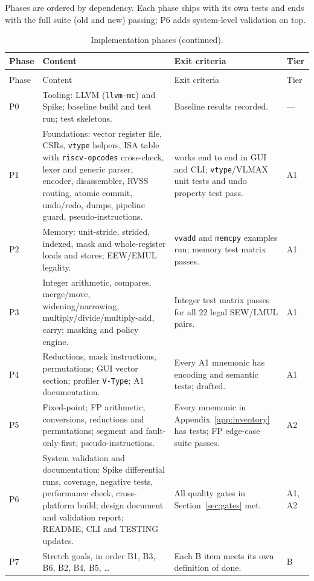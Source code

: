\documentclass[11pt]{article}
\begin{document}
Phases are ordered by dependency. Each phase ships with its own tests and ends with the full
suite (old and new) passing; P6 adds system-level validation on top.

\small
\begin{longtable}{@{}L{1.0cm}L{6.2cm}L{6.4cm}L{1.3cm}@{}}
\caption{Implementation phases.}\label{tab:phases}\\
\toprule
Phase & Content & Exit criteria & Tier \\
\midrule
\endfirsthead
\caption[]{Implementation phases (continued).}\\
\toprule
Phase & Content & Exit criteria & Tier \\
\midrule
\endhead
P0 & Tooling: LLVM (\texttt{llvm-mc}) and Spike; baseline build and test run; test skeletons. & Baseline results recorded. & --- \\
P1 & Foundations: vector register file, CSRs, \texttt{vtype} helpers, ISA table with \texttt{riscv-opcodes} cross-check, lexer and generic parser, encoder, disassembler, RVSS routing, atomic commit, undo/redo, dumps, pipeline guard,  pseudo-instructions. &  works end to end in GUI and CLI; \texttt{vtype}/VLMAX unit tests and undo property test pass. & A1 \\
P2 & Memory: unit-stride, strided, indexed, mask and whole-register loads and stores; EEW/EMUL legality. & \texttt{vvadd} and \texttt{memcpy} examples run; memory test matrix passes. & A1 \\
P3 & Integer arithmetic, compares, merge/move, widening/narrowing, multiply/divide/multiply-add, carry; masking and policy engine. & Integer test matrix passes for all 22 legal SEW/LMUL pairs. & A1 \\
P4 & Reductions, mask instructions, permutations; GUI vector section; profiler \texttt{V-Type}; A1 documentation. & Every A1 mnemonic has encoding and semantic tests;  drafted. & A1 \\
P5 & Fixed-point; FP arithmetic, conversions, reductions and permutations; segment and fault-only-first; pseudo-instructions. & Every mnemonic in Appendix~\ref{app:inventory} has tests; FP edge-case suite passes. & A2 \\
P6 & System validation and documentation: Spike differential runs, coverage, negative tests, performance check, cross-platform build; design document and validation report; README, CLI and TESTING updates. & All quality gates in Section~\ref{sec:gates} met. & A1, A2 \\
P7 & Stretch goals, in order B1, B3, B6, B2, B4, B5, \dots & Each B item meets its own definition of done. & B \\
\bottomrule
\end{longtable}
\normalsize
\end{document}

